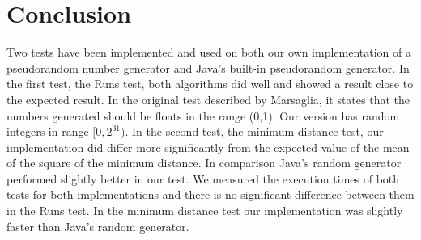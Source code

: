 \section{Conclusion}
Two tests have been implemented and used on both our own implementation of a pseudorandom number generator and Java's built-in pseudorandom generator. In the first test, the Runs test, both algorithms did well and showed a result close to the expected result. In the original test described by Marsaglia, it states that the numbers generated should be floats in the range (0,1). Our version has random integers in range $[0, 2^{31})$. In the second test, the minimum distance test, our implementation did differ more significantly from the expected value of the mean of the square of the minimum distance. In comparison Java's random generator performed slightly better in our test. We measured the execution times of both tests for both implementations and there is no significant difference between them in the Runs test. In the minimum distance test our implementation was slightly faster than Java's random generator. 